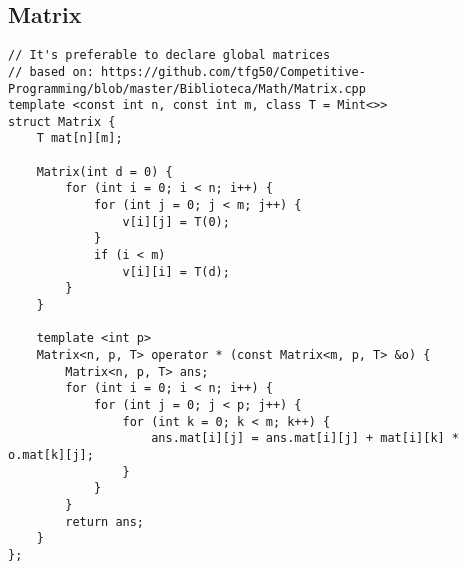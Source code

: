 \documentclass[12pt, a4paper, twoside]{article}
\begin{document}
\subsection{Matrix
}
\begin{lstlisting}
// It's preferable to declare global matrices
// based on: https://github.com/tfg50/Competitive-Programming/blob/master/Biblioteca/Math/Matrix.cpp
template <const int n, const int m, class T = Mint<>>
struct Matrix {
	T mat[n][m];

	Matrix(int d = 0) {
		for (int i = 0; i < n; i++) {
			for (int j = 0; j < m; j++) {
				v[i][j] = T(0);
			}
			if (i < m)
				v[i][i] = T(d);
		}
	}

	template <int p>
	Matrix<n, p, T> operator * (const Matrix<m, p, T> &o) {
		Matrix<n, p, T> ans;
		for (int i = 0; i < n; i++) {
			for (int j = 0; j < p; j++) {
				for (int k = 0; k < m; k++) {
					ans.mat[i][j] = ans.mat[i][j] + mat[i][k] * o.mat[k][j];
				}
			}
		}
		return ans;
	}
};
\end{lstlisting}
\end{document}
